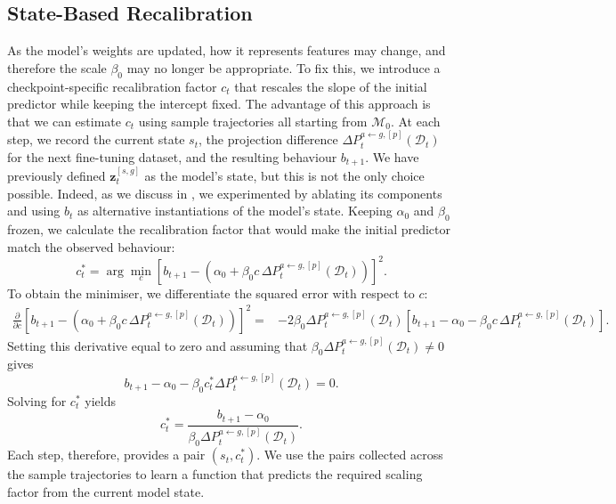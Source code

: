\subsection{State-Based Recalibration}
\label{sec:state-recalibration}
As the model's weights are updated, how it represents features may change, and therefore the scale $\beta_0$ may no longer be appropriate. To fix this, we introduce a checkpoint-specific recalibration factor $c_t$ that rescales the slope of the initial predictor while keeping the intercept fixed. The advantage of this approach is that we can estimate $c_t$ using sample trajectories all starting from $\mathcal{M}_0$. At each step, we record the current state $s_t$, the projection difference $\Delta P_t^{a\leftarrow g,[p]}(\mathcal{D}_t)$ for the next fine-tuning dataset, and the resulting behaviour $b_{t+1}$. We have previously defined $\mathbf{z}_t^{[s,g]}$ as the model's state, but this is not the only choice possible. Indeed, as we discuss in , we experimented by ablating its components and using $b_t$ as alternative instantiations of the model's state. Keeping $\alpha_0$ and $\beta_0$ frozen, we calculate the recalibration factor that would make the initial predictor match the observed behaviour:
\begin{equation}
c_t^*
=
\arg\min_c
\left[
b_{t+1}
-
\left(
\alpha_0+\beta_0 c\,
\Delta P_t^{a\leftarrow g,[p]}(\mathcal{D}_t)
\right)
\right]^2.
\label{eq:optimal-scaling-factor}
\end{equation}
To obtain the minimiser, we differentiate the squared error with respect to $c$:
\begin{align}
\frac{\partial}{\partial c}
\left[
b_{t+1}
-
\left(
\alpha_0+\beta_0 c\,
\Delta P_t^{a\leftarrow g,[p]}(\mathcal{D}_t)
\right)
\right]^2
={}&
-2\beta_0\Delta P_t^{a\leftarrow g,[p]}(\mathcal{D}_t)
\left[
b_{t+1}-\alpha_0
-\beta_0 c\,
\Delta P_t^{a\leftarrow g,[p]}(\mathcal{D}_t)
\right].
\end{align}
Setting this derivative equal to zero and assuming that
$\beta_0\Delta P_t^{a\leftarrow g,[p]}(\mathcal{D}_t)\neq0$ gives
\begin{equation}
b_{t+1}-\alpha_0
-\beta_0 c_t^*\Delta P_t^{a\leftarrow g,[p]}(\mathcal{D}_t)
=0.
\end{equation}
Solving for $c_t^*$ yields
\begin{equation}
c_t^*
=
\frac{b_{t+1}-\alpha_0}
{\beta_0\Delta P_t^{a\leftarrow g,[p]}(\mathcal{D}_t)}.
\end{equation}
Each step, therefore, provides a pair $(s_t, c_t^*)$. We use the pairs collected across the sample trajectories to learn a function that predicts the required scaling factor from the current model state. 